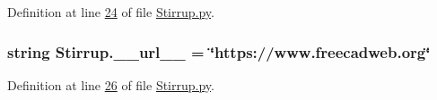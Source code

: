 Definition at line \hyperlink{Stirrup_8py_source_l00024}{24} of file \hyperlink{Stirrup_8py_source}{Stirrup.\+py}.

\subsubsection[{\texorpdfstring{\+\_\+\+\_\+url\+\_\+\+\_\+}{__url__}}]{\setlength{\rightskip}{0pt plus 5cm}string Stirrup.\+\_\+\+\_\+url\+\_\+\+\_\+ = \char`\"{}https\+://www.\+freecadweb.\+org\char`\"{}\hspace{0.3cm}{\ttfamily [private]}}\hypertarget{namespaceStirrup_a3b5b07aa3d0183155a2be24e2d0d4a82}{}\label{namespaceStirrup_a3b5b07aa3d0183155a2be24e2d0d4a82}


Definition at line \hyperlink{Stirrup_8py_source_l00026}{26} of file \hyperlink{Stirrup_8py_source}{Stirrup.\+py}.

